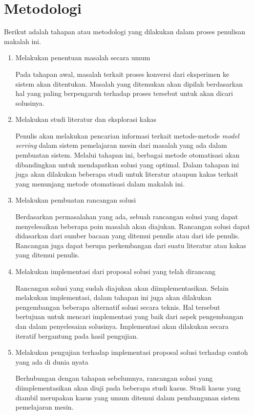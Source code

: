 \section{Metodologi}

Berikut adalah tahapan atau metodologi yang dilakukan dalam proses penulisan makalah ini.

\begin{enumerate}
  \item Melakukan penentuan masalah secara umum
  
  Pada tahapan awal, masalah terkait proses konversi dari eksperimen ke sistem akan ditentukan.
  Masalah yang ditemukan akan dipilah berdasarkan hal yang paling berpengaruh terhadap proses tersebut untuk akan dicari solusinya.

  \item Melakukan studi literatur dan eksplorasi kakas
  
  Penulis akan melakukan pencarian informasi terkait metode-metode \textit{model serving} dalam sistem pemelajaran mesin dari masalah yang ada dalam pembuatan sistem.
  Melalui tahapan ini, berbagai metode otomatisasi akan dibandingkan untuk mendapatkan solusi yang optimal.
  Dalam tahapan ini juga akan dilakukan beberapa studi untuk literatur ataupun kakas terkait yang menunjang metode otomatisasi dalam makalah ini.

  \item Melakukan pembuatan rancangan solusi
  
  Berdasarkan permasalahan yang ada, sebuah rancangan solusi yang dapat menyelesaikan beberapa poin masalah akan diajukan.
  Rancangan solusi dapat didasarkan dari sumber bacaan yang ditemui penulis atau dari ide penulis.
  Rancangan juga dapat berupa perkembangan dari suatu literatur atau kakas yang ditemui penulis.

  \item Melakukan implementasi dari proposal solusi yang telah dirancang
  
  Rancangan solusi yang sudah diajukan akan diimplementasikan.
  Selain melakukan implementasi, dalam tahapan ini juga akan dilakukan pengembangan beberapa alternatif solusi secara teknis.
  Hal tersebut bertujuan untuk mencari implementasi yang baik dari aspek pengembangan dan dalam penyelesaian solusinya.
  Implementasi akan dilakukan secara iteratif bergantung pada hasil pengujian.

  \item Melakukan pengujian terhadap implementasi proposal solusi terhadap contoh yang ada di dunia nyata
  
  Berhubungan dengan tahapan sebelumnya, rancangan solusi yang diimplementasikan akan diuji pada beberapa studi kasus.
  Studi kasus yang diambil merupakan kasus yang umum ditemui dalam pembangunan sistem pemelajaran mesin.
  
\end{enumerate}